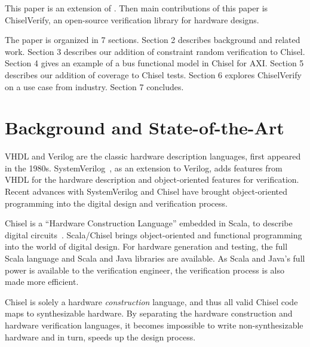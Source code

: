 \documentclass[runningheads]{llncs}
\newcommand{\todo}[1]{{\color{olive} TODO: #1}}
\renewcommand{\todo}[1]{}
\begin{document}
This paper is an extension of \cite{verify:chisel:2020}. Then main contributions of
this paper is ChiselVerify, an open-source verification library for hardware designs.

The paper is organized in 7 sections.
Section 2 describes background and related work.
Section 3 describes our addition of constraint random verification to Chisel.
Section 4 gives an example of a bus functional model in Chisel for AXI.
Section 5 describes our addition of coverage to Chisel tests.
Section 6 explores ChiselVerify on a use case from industry.
Section 7 concludes.


\section{Background and State-of-the-Art}
\label{sec:background}


\todo{Talk about Kevin Lauefer's work and verif}




VHDL and Verilog are the classic hardware description languages, first appeared in the 1980s.
SystemVerilog~\cite{SystemVerilog}, as an extension to Verilog, adds features from VHDL
for the hardware description and object-oriented features for verification.
Recent advances with SystemVerilog and Chisel \cite{chisel:dac2012, chisel:book} have
brought object-oriented programming into the digital design and verification process.

Chisel is a ``Hardware Construction Language'' embedded in Scala, to describe digital circuits~\cite{chisel:dac2012}.
Scala/Chisel brings object-oriented and functional programming into the world of digital design.
For hardware generation and testing, the full Scala language and Scala and Java libraries are available.
As Scala and Java's full power is available to the verification engineer,
the verification process is also made more efficient.

Chisel is solely a hardware \emph{construction} language, and thus all valid Chisel code
maps to synthesizable hardware.
By separating the hardware construction and hardware verification languages,
it becomes impossible to write non-synthesizable hardware and in turn, speeds up the design process.
\end{document}
